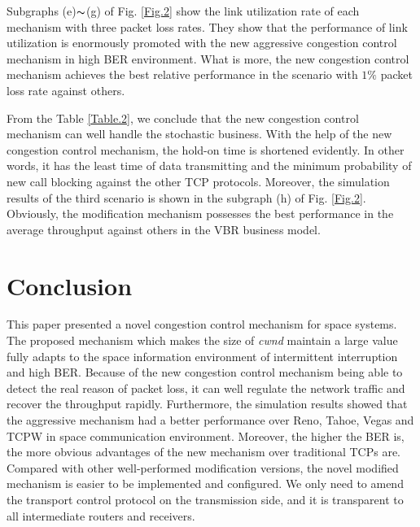 \documentclass[draftclsnofoot,onecolumn,11pt]{IEEEtran}
\begin{document}








Subgraphs (e)$\thicksim$(g) of Fig. \ref{Fig.2} show the link utilization rate of each mechanism with three packet loss rates. They show that the performance of link utilization is enormously promoted with the new aggressive congestion control mechanism in high BER environment.
What is more, the new congestion control mechanism achieves the best relative performance in the scenario with $1\%$ packet loss rate against others.

From the Table \ref{Table.2}, we conclude that the new congestion control mechanism can well handle the stochastic business. With the help of the new congestion control mechanism, the hold-on time is shortened evidently. In other words, it has the least time of data transmitting and the minimum probability of new call blocking against the other TCP protocols. Moreover, the simulation results of the third scenario is shown in the subgraph (h) of Fig. \ref{Fig.2}. Obviously, the modification mechanism possesses the best performance in the average throughput against others in the VBR business model.

\section{Conclusion}

This paper presented a novel congestion control mechanism for space systems. The proposed mechanism which makes the size of \emph{cwnd} maintain a large value fully adapts to the space information environment of intermittent interruption and high BER. Because of the new congestion control mechanism being able to detect the real reason of packet loss, it can well regulate the network traffic and recover the throughput rapidly. Furthermore, the simulation results showed that the aggressive mechanism had a better performance over Reno, Tahoe, Vegas and TCPW in space communication environment. Moreover, the higher the BER is, the more obvious advantages of the new mechanism over traditional TCPs are. Compared with other well-performed modification versions, the novel modified mechanism is easier to be implemented and configured. We only need to amend the transport control protocol on the transmission side, and it is transparent to all intermediate routers and receivers.
\end{document}
